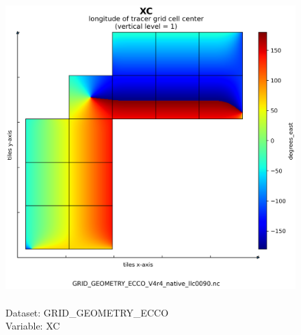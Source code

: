 \begin{figure}[H]
\centering
\includegraphics[scale=0.5]{../images/plots/native_plots_coords/Geometry_Parameters_for_the_Lat-Lon-Cap_90_(llc90)_Native_Model_Grid_(Version_4_Release_4)/XC.png}
\caption{\\Dataset: GRID\_GEOMETRY\_ECCO\\Variable: XC}
\label{tab:table-GRID_GEOMETRY_ECCO_XC-Plot}
\end{figure}
\pagebreak

